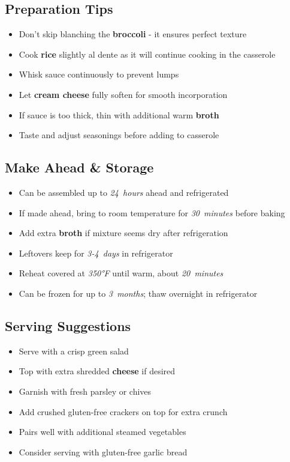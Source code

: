 \documentclass[11pt,letterpaper]{article}
\begin{document}
{\begin{multicols}{2}
\subsection*{Preparation Tips}
\begin{itemize}
    \item Don't skip blanching the \textbf{broccoli} - it ensures perfect texture
    \item Cook \textbf{rice} slightly al dente as it will continue cooking in the casserole
    \item Whisk sauce continuously to prevent lumps
    \item Let \textbf{cream cheese} fully soften for smooth incorporation
    \item If sauce is too thick, thin with additional warm \textbf{broth}
    \item Taste and adjust seasonings before adding to casserole
\end{itemize}

\subsection*{Make Ahead \& Storage}
\begin{itemize}
    \item Can be assembled up to \textit{24~hours} ahead and refrigerated
    \item If made ahead, bring to room temperature for \textit{30~minutes} before baking
    \item Add extra \textbf{broth} if mixture seems dry after refrigeration
    \item Leftovers keep for \textit{3-4~days} in refrigerator
    \item Reheat covered at \textit{350°F} until warm, about \textit{20~minutes}
    \item Can be frozen for up to \textit{3~months}; thaw overnight in refrigerator
\end{itemize}

\subsection*{Serving Suggestions}
\begin{itemize}
    \item Serve with a crisp green salad
    \item Top with extra shredded \textbf{cheese} if desired
    \item Garnish with fresh parsley or chives
    \item Add crushed gluten-free crackers on top for extra crunch
    \item Pairs well with additional steamed vegetables
    \item Consider serving with gluten-free garlic bread
\end{itemize}

\end{multicols}
}
\end{document}
